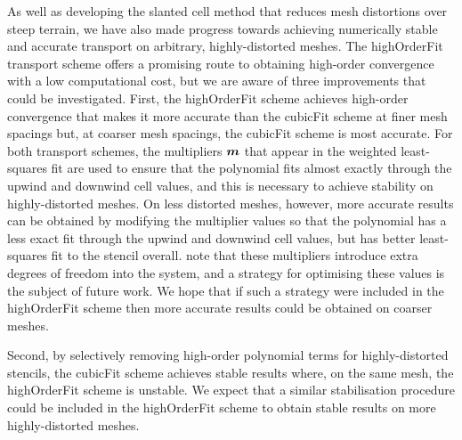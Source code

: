 As well as developing the slanted cell method that reduces mesh distortions over steep terrain, we have also made progress towards achieving numerically stable and accurate transport on arbitrary, highly-distorted meshes.
The highOrderFit transport scheme offers a promising route to obtaining high-order convergence with a low computational cost, but we are aware of three improvements that could be investigated.
First, the highOrderFit scheme achieves high-order convergence that makes it more accurate than the cubicFit scheme at finer mesh spacings but, at coarser mesh spacings, the cubicFit scheme is most accurate.
For both transport schemes, the multipliers $\bm{m}$ that appear in the weighted least-squares fit are used to ensure that the polynomial fits almost exactly through the upwind and downwind cell values, and this is necessary to achieve stability on highly-distorted meshes.
On less distorted meshes, however, more accurate results can be obtained by modifying the multiplier values so that the polynomial has a less exact fit through the upwind and downwind cell values, but has better least-squares fit to the stencil overall.
\citet{devendran2017} note that these multipliers introduce extra degrees of freedom into the system, and a strategy for optimising these values is the subject of future work.
We hope that if such a strategy were included in the highOrderFit scheme then more accurate results could be obtained on coarser meshes.

Second, by selectively removing high-order polynomial terms for highly-distorted stencils, the cubicFit scheme achieves stable results where, on the same mesh, the highOrderFit scheme is unstable.
We expect that a similar stabilisation procedure could be included in the highOrderFit scheme to obtain stable results on more highly-distorted meshes.



